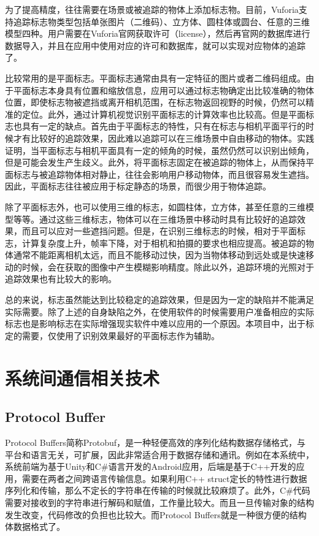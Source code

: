 	为了提高精度，往往需要在场景或被追踪的物体上添加标志物。目前，Vuforia支持追踪标志物类型包括单张图片（二维码）、立方体、圆柱体或圆台、任意的三维模型四种。用户需要在Vuforia官网获取许可（license），然后再官网的数据库进行数据导入，并且在应用中使用对应的许可和数据库，就可以实现对应物体的追踪了。
	
比较常用的是平面标志。平面标志通常由具有一定特征的图片或者二维码组成。由于平面标志本身具有位置和缩放信息，应用可以通过标志物确定出比较准确的物体位置，即使标志物被遮挡或离开相机范围，在标志物返回视野的时候，仍然可以精准的定位。此外，通过计算机视觉识别平面标志的计算效率也比较高。但是平面标志也具有一定的缺点。首先由于平面标志的特性，只有在标志与相机平面平行的时候才有比较好的追踪效果，因此难以追踪可以在三维场景中自由移动的物体。实践证明，当平面标志与相机平面具有一定的倾角的时候，虽然仍然可以识别出倾角，但是可能会发生产生歧义。此外，将平面标志固定在被追踪的物体上，从而保持平面标志与被追踪物体相对静止，往往会影响用户移动物体，而且很容易发生遮挡。因此，平面标志往往被应用于标定静态的场景，而很少用于物体追踪。

除了平面标志外，也可以使用三维的标志，如圆柱体，立方体，甚至任意的三维模型等等。通过这些三维标志，物体可以在三维场景中移动时具有比较好的追踪效果，而且可以应对一些遮挡问题。但是，在识别三维标志的时候，相对于平面标志，计算复杂度上升，帧率下降，对于相机和拍摄的要求也相应提高。被追踪的物体通常不能距离相机太远，而且不能移动过快，因为当物体移动到远处或是快速移动的时候，会在获取的图像中产生模糊影响精度。除此以外，追踪环境的光照对于追踪效果也有比较大的影响。

总的来说，标志虽然能达到比较稳定的追踪效果，但是因为一定的缺陷并不能满足实际需要。除了上述的自身缺陷之外，在使用软件的时候需要用户准备相应的实际标志也是影响标志在实际增强现实软件中难以应用的一个原因。本项目中，出于标定的需要，仅使用了识别效果最好的平面标志作为辅助。

\section{系统间通信相关技术}
\subsection{Protocol Buffer}
Protocol Buffers简称Protobuf，是一种轻便高效的序列化结构数据存储格式，与平台和语言无关，可扩展，因此非常适合用于数据存储和通讯。例如在本系统中，系统前端为基于Unity和C\#语言开发的Android应用，后端是基于C++开发的应用，需要在两者之间跨语言传输信息。如果利用C++ struct定长的特性进行数据序列化和传输，那么不定长的字符串在传输的时候就比较麻烦了。此外，C\#代码需要对接收到的字符串进行解码和赋值，工作量比较大。而且一旦传输对象的结构发生改变，代码修改的负担也比较大。而Protocol Buffers就是一种很方便的结构体数据格式了。

